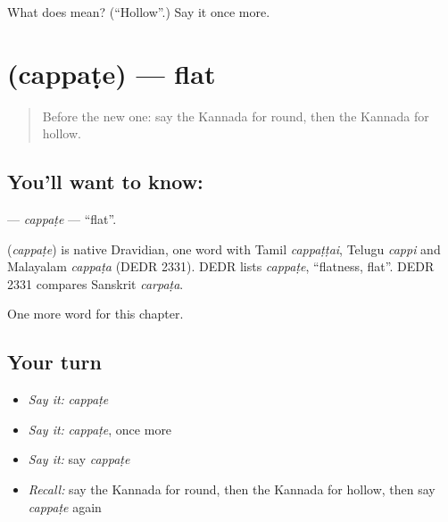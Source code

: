 \begin{tcolorbox}[breakable,colback=teal!4,colframe=teal!35!black,title={Before you move on}]
What does  mean? (\textquotedblleft{}Hollow\textquotedblright{}.) Say it once more.
\end{tcolorbox}
\section[\texorpdfstring{\kn{ಚಪ್ಪಟೆ} (cappaṭe)}{ಚಪ್ಪಟೆ (cappaṭe)}]{ (cappaṭe) — flat}

\label{lesson:KA-C256-cappate}



\begin{quote}
Before the new one: say the Kannada for round, then the Kannada for hollow.
\end{quote}

\subsection*{You'll want to know: }
\textbf{} — \emph{cappaṭe} — \textquotedblleft{}flat\textquotedblright{}.

\begin{cousinweb}
\textbf{} (\emph{cappaṭe}) is native Dravidian, one word with Tamil \emph{cappaṭṭai}, Telugu \emph{cappi} and Malayalam \emph{cappaṭa} (DEDR 2331). DEDR lists \emph{cappaṭe}, \textquotedblleft{}flatness, flat\textquotedblright{}. DEDR 2331 compares Sanskrit \emph{carpaṭa}.
\end{cousinweb}

\begin{grammarlens}[title={What you've built}]
One more word for this chapter.
\end{grammarlens}

\subsection*{Your turn}
\begin{itemize}
\raggedright
  \item \emph{Say it:} \emph{cappaṭe}
  \item \emph{Say it:} \emph{cappaṭe}, once more
  \item \emph{Say it:} say \emph{cappaṭe}
  \item \emph{Recall:} say the Kannada for round, then the Kannada for hollow, then say \emph{cappaṭe} again
\end{itemize}


